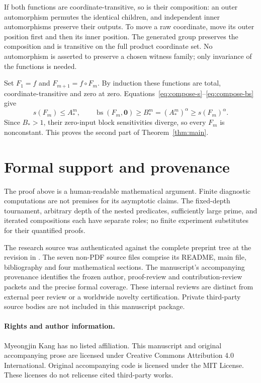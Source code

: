 \documentclass[11pt]{article}
\theoremstyle{definition}
\DeclareMathOperator{\bs}{bs}
\newcommand{\zero}{\mathbf 0}
\begin{document}
If both functions are coordinate-transitive, so is their composition: an outer automorphism permutes the identical children, and independent inner automorphisms preserve their outputs. To move a raw coordinate, move its outer position first and then its inner position. The generated group preserves the composition and is transitive on the full product coordinate set. No automorphism is asserted to preserve a chosen witness family; only invariance of the functions is needed.

Set $F_1=f$ and $F_{m+1}=f\circ F_m$. By induction these functions are total, coordinate-transitive and zero at zero. Equations~\eqref{eq:compose-s}--\eqref{eq:compose-bs} give
\[
 s(F_m)\le A_*^m,\qquad
 \bs(F_m,\zero)\ge B_*^m=(A_*^m)^\alpha\ge s(F_m)^\alpha.
\]
Since $B_*>1$, their zero-input block sensitivities diverge, so every $F_m$ is nonconstant. This proves the second part of Theorem~\ref{thm:main}.

\section{Formal support and provenance}\label{sec:formal}


The proof above is a human-readable mathematical argument. Finite diagnostic computations are not premises for its asymptotic claims. The fixed-depth tournament, arbitrary depth of the nested predicates, sufficiently large prime, and iterated compositions each have separate roles; no finite experiment substitutes for their quantified proofs.

The research source was authenticated against the complete preprint tree at the revision in \cite{OpenAI}. The seven non-PDF source files comprise its README, main file, bibliography and four mathematical sections. The manuscript's accompanying provenance identifies the frozen author, proof-review and contribution-review packets and the precise formal coverage. These internal reviews are distinct from external peer review or a worldwide novelty certification. Private third-party source bodies are not included in this manuscript package.

\paragraph{Rights and author information.}
Myeongjin Kang has no listed affiliation. This manuscript and original accompanying prose are licensed under Creative Commons Attribution 4.0 International. Original accompanying code is licensed under the MIT License. These licenses do not relicense cited third-party works.
\end{document}
